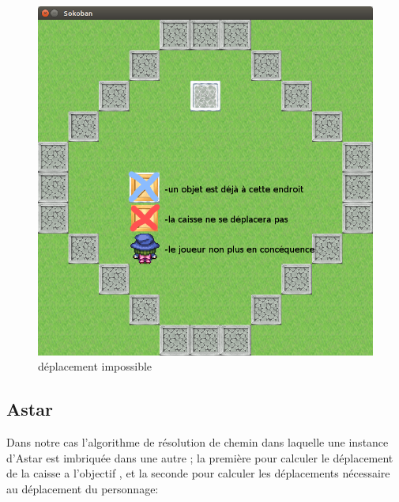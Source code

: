 \documentclass{article}
\begin{document}
\begin{figure}
\begin{center}
\begin{minipage}[b]{0.4\textwidth}
    \includegraphics[width=\textwidth]{../Screenshots/04.png}
    \caption{déplacement impossible}
  \end{minipage}
				
				
							
	\end{center}
	\end{figure}	
		
		
		
		
			
	\newpage
		\subsection{Astar}
		\vspace{0.5cm}
		Dans notre cas l'algorithme de résolution de chemin dans laquelle une instance d'Astar  est imbriquée dans une autre ; la première pour calculer le déplacement de la caisse a l'objectif , et la seconde pour calculer les déplacements nécessaire au déplacement du personnage:
		
\end{document}
